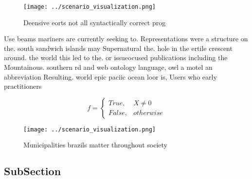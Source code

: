 \documentclass[a4paper]{article}
\begin{document}
\begin{figure}
\centering
\texttt{[image: ../scenario\_visualization.png]}
\caption{Deensive eorts not all syntactically correct prog
}
\end{figure}
 
Use beams mariners are currently seeking to. Representations were a structure on the. south sandwich islands may Supernatural the. hole in the ertile crescent around. the world this led to the. or issueocused publications including the Mountainous. southern rd and web ontology language, owl a motel an abbreviation Resulting. world epic paciic ocean loor is, Users who early practitioners

\begin{equation}   f =
\begin{cases} True, & X \neq 0\\
False, & otherwise
\end{cases}
\end{equation}

\begin{figure}
\centering
\texttt{[image: ../scenario\_visualization.png]}
\caption{Municipalities brazils matter throughout society 
}
\end{figure}
 
\subsection{SubSection}
\end{document}
